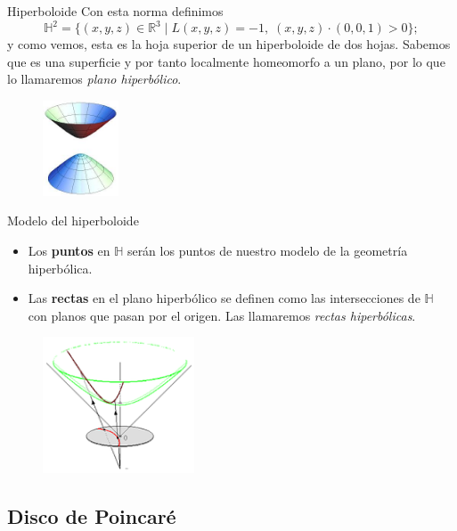 \documentclass[compress]{beamer}
\begin{document}
\begin{frame}{Hiperboloide}
  Con esta norma definimos
  \[\mathbb{H}^2=\{(x,y,z)\in\mathbb{R}^3 \mid L(x,y,z)=-1,\; (x,y,z) \cdot (0,0,1) > 0 \};\]
  y como vemos, esta es la hoja superior de un hiperboloide de dos
  hojas. Sabemos que es una superficie y por tanto localmente
  homeomorfo a un plano, por lo que lo llamaremos \textit{plano
    hiperbólico}.

  \begin{figure}[ht!]
    \centering
    \includegraphics[width=0.2\textwidth]{hiperboloide.jpg}
  \end{figure}
\end{frame}

\begin{frame}{Modelo del hiperboloide}
  \begin{itemize}
  \item Los \textbf{puntos} en $\mathbb{H}$ serán los puntos de nuestro modelo
    de la geometría hiperbólica.
  \item Las \textbf{rectas} en el plano hiperbólico se definen como las intersecciones
    de $\mathbb{H}$ con planos que pasan por el origen. Las llamaremos
    \textit{rectas hiperbólicas}.
  \end{itemize}
  
  \begin{figure}[ht!]
    \centering
    \includegraphics[width=0.4\textwidth]{hyperboloiddisc.png}
  \end{figure}
\end{frame}



\subsection{Disco de Poincaré}
\end{document}
